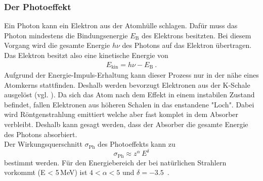 \subsubsection{Der Photoeffekt}
Ein Photon kann ein Elektron aus der Atomhülle schlagen. Dafür muss das Photon mindestens die Bindungsenergie $E_\text{B}$ des Elektrons besitzten. Bei diesem Vorgang wird die gesamte Energie $h\nu$ des Photons auf das Elektron übertragen. Das Elektron besitzt also eine kinetische Energie von
\begin{align}
	E_\text{kin} = h\nu - E_\text{B} \ .
\end{align}
Aufgrund der Energie-Impuls-Erhaltung kann dieser Prozess nur in der nähe eines Atomkerns stattfinden. Deshalb werden bevorzugt Elektronen aus der K-Schale ausgelöst (vgl. \cite[3]{V18}). Da sich das Atom nach dem Effekt in einem instabilen Zustand befindet, fallen Elektronen aus höheren Schalen in das enstandene "Loch". Dabei wird Röntgenstrahlung emittiert welche aber fast komplet in dem Absorber verbleibt. Deshalb kann gesagt werden, dass der Absorber die gesamte Energie des Photons absorbiert. \\
Der Wirkungsquerschnitt $\sigma_\text{Ph}$ des Photoeffekts kann zu
\begin{equation}
	\sigma_\text{Ph} \approx z^{\alpha}\,E^{\delta}
\end{equation}
bestimmt werden. Für den Energiebereich der bei natürlichen Strahlern vorkommt (E < 5\,MeV) ist $4 < \alpha < 5$ und $\delta = -3.5$\ .



